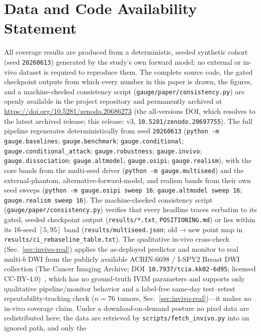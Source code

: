 \documentclass[11pt]{article}
\begin{document}
\section*{Data and Code Availability Statement}
All coverage results are produced from a deterministic, seeded synthetic cohort
(seed \texttt{20260613}) generated by the study's own forward model; no external or
in-vivo dataset is required to reproduce them. The complete source code, the gated
checkpoint outputs from which every number in this paper is drawn, the figures, and
a machine-checked consistency script (\texttt{gauge/paper/consistency.py}) are
openly available in the project repository and permanently archived at
\href{https://doi.org/10.5281/zenodo.20686273}{https://doi.org/10.5281/zenodo.20686273}
(the all-versions DOI, which resolves to the latest archived release; this
release: v3, \texttt{10.5281/zenodo.20697755}).
The full pipeline regenerates deterministically from seed \texttt{20260613}
(\texttt{python -m gauge.baselines}; \texttt{gauge.benchmark};
\texttt{gauge.conditional}; \texttt{gauge.conditional\_attack};
\texttt{gauge.robustness}; \texttt{gauge.invivo}; \texttt{gauge.dissociation};
\texttt{gauge.altmodel}; \texttt{gauge.osipi}; \texttt{gauge.realism}), with the
core bands from the multi-seed driver (\texttt{python -m gauge.multiseed}) and the
external-phantom, alternative-forward-model, and realism bands from their own seed
sweeps (\texttt{python -m gauge.osipi sweep 16}; \texttt{gauge.altmodel sweep 16};
\texttt{gauge.realism sweep 16}). The machine-checked consistency script
(\texttt{gauge/paper/consistency.py}) verifies that every headline traces verbatim
to its gated, seeded checkpoint output (\texttt{results/*.txt},
\texttt{POSITIONING.md}) or lies within its 16-seed $[5,95]$ band
(\texttt{results/multiseed.json}; old$\to$new point map in
\texttt{results/ci\_rebaseline\_table.txt}).
The qualitative in-vivo cross-check (Sec.~\ref{sec:invivo-real}) applies the
as-deployed predictor and monitor to real multi-$b$ DWI from the publicly available
ACRIN-6698 / I-SPY2 Breast DWI collection (The Cancer Imaging Archive;
DOI~\texttt{10.7937/tcia.kk02-6d95}; licensed CC-BY-4.0)~\cite{acrin6698,clark2013tcia},
which has no ground-truth IVIM parameters and supports only qualitative
pipeline/monitor behavior and a label-free same-day test--retest
repeatability-tracking check ($n{=}76$ tumors, Sec.~\ref{sec:invivo-real})---it
makes no in-vivo coverage claim. Under a
download-on-demand posture no pixel data are redistributed here; the data are
retrieved by \texttt{scripts/fetch\_invivo.py} into an ignored path, and only the
\end{document}
